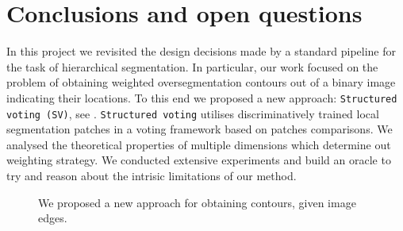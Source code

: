 \chapter{Conclusions and open questions} %
\label{Chapter6}
In this project we revisited the design decisions made by a standard pipeline \cite{Arbelaez11} for the task of hierarchical segmentation. In particular, our work focused on the problem of obtaining weighted oversegmentation contours out of a binary image indicating %
their locations. To this end we proposed a new approach: {\tt Structured voting (SV)}, see . {\tt Structured voting} utilises discriminatively trained local segmentation patches in a voting framework based on patches comparisons. We analysed the theoretical properties of multiple dimensions which determine out weighting strategy. We conducted extensive experiments and build an oracle to try and reason about the intrisic limitations of our method.

\begin{figure}[t]
\centering
{}
\caption[From edges to contours: a new approach]{We proposed a new approach for obtaining contours, given image edges.}
\label{fig:weighting-oversegm-contours}
\end{figure}


